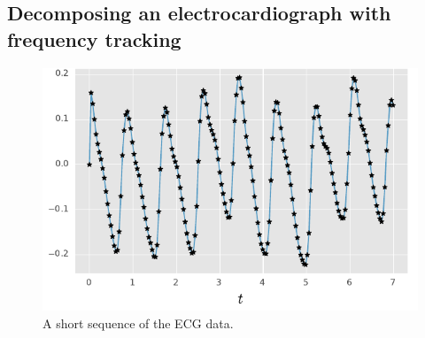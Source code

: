 \subsection{Decomposing an electrocardiograph with frequency tracking}
\parencite{Sarkka2012}
 
 \begin{figure}[htb]%
    \centering%
    \includegraphics{img/harmonic_trajectory}%
	\caption{%
	A short sequence of the ECG data. %
   	}
	\label{fig:ecg_data}
 \end{figure}
 
